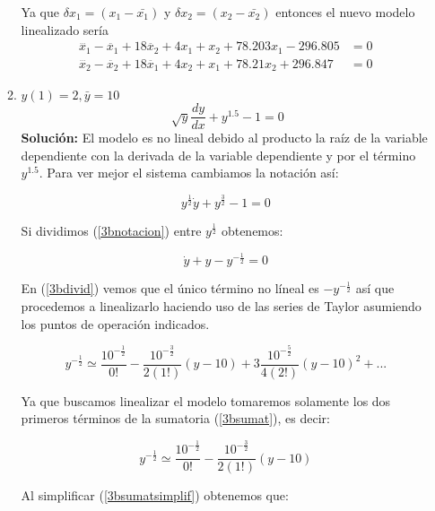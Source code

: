 \documentclass[letterpaper, 12pt]{article}
\begin{document}
\begin{enumerate}
\begin{enumerate}
Ya que $\delta x_1 = (x_1-\bar {x_1})$ y $\delta x_2 = (x_2-\bar{x_2})$ entonces el nuevo modelo linealizado sería 
\begin{equation}
\begin{split}
    \dddot{x_1}-\ddot{x_1}+18\ddot{x_2}+4x_1 + x_2 +78.203 x_1-296.805 &= 0 \\ \dddot{x_2}-\ddot{x_2}+18\ddot{x_1}+4x_2 +x_1 +78.21 x_2+296.847 &= 0 
\end{split}
\label{nuevomod3afinish}
\end{equation}
\item $y(1)=2,\bar{y}=10$
\begin{equation}
     \sqrt[]{y}\frac{dy}{dx}+y^{1.5}-1 = 0
\end{equation}
\textbf{Solución:}
El modelo es no lineal debido al producto la raíz de la variable dependiente con la derivada de la variable dependiente y por el término $y^{1.5}$.
Para ver mejor el sistema cambiamos la notación así:

\begin{equation}
     y^{\frac{1}{2}}\dot{y}+y^{\frac{3}{2}}-1 = 0
     \label{3bnotacion}
\end{equation}

Si dividimos (\ref{3bnotacion}) entre $y^{\frac{1}{2}}$ obtenemos:

\begin{equation}
     \dot{y}+y-y^{-\frac{1}{2}} = 0
     \label{3bdivid}
\end{equation}

En (\ref{3bdivid}) vemos que el único término no líneal es $-y^{-\frac{1}{2}}$ así que procedemos a linealizarlo haciendo uso de las series de Taylor asumiendo los puntos de operación indicados.

\begin{equation}
    y^{-\frac{1}{2}}\simeq \frac{10^{-\frac{1}{2}}}{0!}-\frac{10^{-\frac{3}{2}}}{{2(1!)}}(y-10)+3\frac{10^{-\frac{5}{2}}}{{4(2!)}}(y-10)^2+...
    \label{3bsumat}
\end{equation}

Ya que buscamos linealizar el modelo tomaremos solamente los dos primeros términos de la sumatoria (\ref{3bsumat}), es decir:

\begin{equation}
    y^{-\frac{1}{2}}\simeq \frac{10^{-\frac{1}{2}}}{0!}-\frac{10^{-\frac{3}{2}}}{{2(1!)}}(y-10)
    \label{3bsumatsimplif}
\end{equation}

Al simplificar (\ref{3bsumatsimplif}) obtenemos que:


\end{enumerate}
\end{enumerate}
\end{document}
